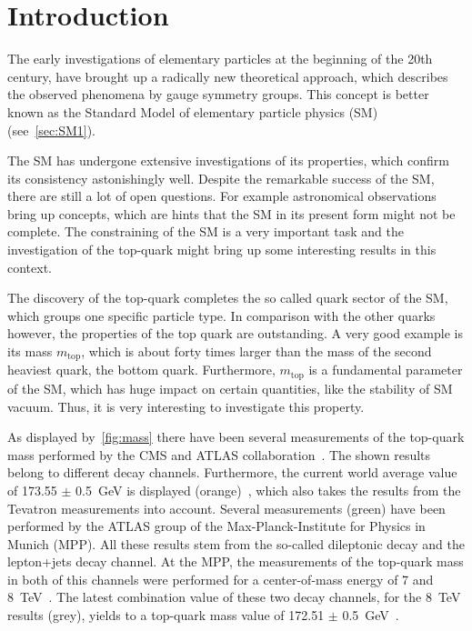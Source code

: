 \chapter{Introduction}

\label{sec:intro}

The early investigations  of elementary particles at the beginning of the 20th century, have brought up a radically new theoretical approach, which describes the observed phenomena by gauge symmetry groups. This concept is better known as the Standard Model of elementary particle physics (SM) (see~\cref{sec:SM1}).

The SM has undergone extensive investigations of its properties, which confirm its consistency astonishingly well. Despite the remarkable success of the SM, there are still a lot of open questions. For example astronomical observations  bring up concepts, which are hints that the SM in its present form might not be complete. The constraining of the SM  is a very important task and the investigation of the top-quark might bring up some interesting results in this context. 

The discovery of the top-quark completes the so called quark sector of the SM, which groups one specific particle type. In comparison with the other quarks however, the properties of the top quark are outstanding. A very good example  is its mass $m_{\text{top}}$, which is about forty times larger than the mass of the second heaviest quark, the bottom quark. Furthermore, $m_{\text{top}}$ is a fundamental parameter of the SM, which has huge impact on certain quantities, like the stability of SM vacuum.  Thus, it is very interesting to investigate this property.

As displayed by~\cref{fig:mass} there have been several measurements of the top-quark mass performed by the CMS and ATLAS collaboration~\cite{PubR}. The shown results belong to different decay channels. Furthermore, the current world average value of 173.55 $\pm$ 0.5~GeV is displayed (orange)~\cite{ATLAS:2014wva}, which also takes the results from the Tevatron measurements into account. Several measurements (green) have been performed by the ATLAS group of the Max-Planck-Institute for Physics in Munich (MPP). All these results stem from the so-called dileptonic decay and the lepton+jets decay channel. At the MPP, the measurements of the top-quark mass in both of this channels were performed for a center-of-mass energy of 7 and 8~TeV~\cite{Aad:2015nba,Aaboud:2016igd,ATLAS-CONF-2017-071}. The latest combination value of these two decay channels, for the  8~TeV results (grey), yields to a top-quark mass value of 172.51 $\pm$ 0.5~GeV~\cite{ATLAS-CONF-2017-071}.

